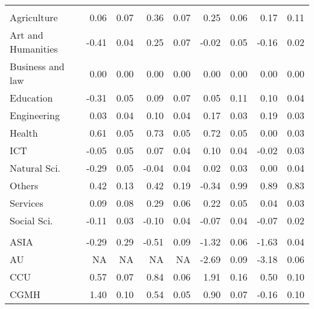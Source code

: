 \begin{longtable}[t]{lrrrrrrrr}
\endfoot
\bottomrule
\endlastfoot
\addlinespace[0.3em]
\multicolumn{9}{l}{\textit{\textbf{Panel A: }}}\\
\hspace{1em}Agriculture & 0.06 & 0.07 & 0.36 & 0.07 & 0.25 & 0.06 & 0.17 & 0.11\\
\hspace{1em}Art and Humanities & -0.41 & 0.04 & 0.25 & 0.07 & -0.02 & 0.05 & -0.16 & 0.02\\
\hspace{1em}Business and law & 0.00 & 0.00 & 0.00 & 0.00 & 0.00 & 0.00 & 0.00 & 0.00\\
\hspace{1em}Education & -0.31 & 0.05 & 0.09 & 0.07 & 0.05 & 0.11 & 0.10 & 0.04\\
\hspace{1em}Engineering & 0.03 & 0.04 & 0.10 & 0.04 & 0.17 & 0.03 & 0.19 & 0.03\\
\hspace{1em}Health & 0.61 & 0.05 & 0.73 & 0.05 & 0.72 & 0.05 & 0.00 & 0.03\\
\hspace{1em}ICT & -0.05 & 0.05 & 0.07 & 0.04 & 0.10 & 0.04 & -0.02 & 0.03\\
\hspace{1em}Natural Sci. & -0.29 & 0.05 & -0.04 & 0.04 & 0.02 & 0.03 & 0.00 & 0.04\\
\hspace{1em}Others & 0.42 & 0.13 & 0.42 & 0.19 & -0.34 & 0.99 & 0.89 & 0.83\\
\hspace{1em}Services & 0.09 & 0.08 & 0.29 & 0.06 & 0.22 & 0.05 & 0.04 & 0.03\\
\hspace{1em}Social Sci. & -0.11 & 0.03 & -0.10 & 0.04 & -0.07 & 0.04 & -0.07 & 0.02\\
\addlinespace[0.3em]
\multicolumn{9}{l}{\textit{\textbf{Panel B: }}}\\
\hspace{1em}ASIA & -0.29 & 0.29 & -0.51 & 0.09 & -1.32 & 0.06 & -1.63 & 0.04\\
\hspace{1em}AU & NA & NA & NA & NA & -2.69 & 0.09 & -3.18 & 0.06\\
\hspace{1em}CCU & 0.57 & 0.07 & 0.84 & 0.06 & 1.91 & 0.16 & 0.50 & 0.10\\
\hspace{1em}CGMH & 1.40 & 0.10 & 0.54 & 0.05 & 0.90 & 0.07 & -0.16 & 0.10\\

\end{longtable}
